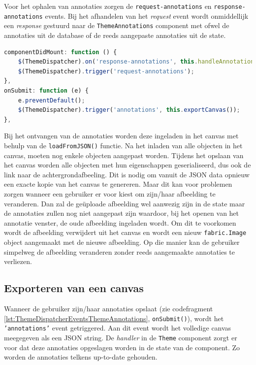 Voor het ophalen van annotaties zorgen de \texttt{request-annotations} en \texttt{response-annotations} events. Bij het afhandelen van het \textit{request} event wordt onmiddellijk een \textit{response} gestuurd naar de \texttt{ThemeAnnotations} component met ofwel de annotaties uit de database of de reeds aangepaste annotaties uit de state. 

\begin{lstlisting}[caption={ThemeAnnotations component - events},label=lst:ThemeDispatcherEventsThemeAnnotations,language=javascript]
componentDidMount: function () {
  	$(ThemeDispatcher).on('response-annotations', this.handleAnnotations);
	$(ThemeDispatcher).trigger('request-annotations');
},
onSubmit: function (e) {
	e.preventDefault();
	$(ThemeDispatcher).trigger('annotations', this.exportCanvas());
},
\end{lstlisting}

Bij het ontvangen van de annotaties worden deze ingeladen in het canvas met behulp van de \texttt{loadFromJSON()} functie. Na het inladen van alle objecten in het canvas, moeten nog enkele objecten aangepast worden. Tijdens het opslaan van het canvas worden alle objecten met hun eigenschappen geserialiseerd, dus ook de link naar de achtergrondafbeeling. Dit is nodig om vanuit de JSON data opnieuw een exacte kopie van het canvas te genereren. Maar dit kan voor problemen zorgen wanneer een gebruiker er voor kiest om zijn/haar afbeelding te veranderen. Dan zal de ge\"{u}ploade afbeelding wel aanwezig zijn in de state maar de annotaties zullen nog niet aangepast zijn waardoor, bij het openen van het annotatie venster, de oude afbeelding ingeladen wordt. Om dit te voorkomen wordt de afbeelding verwijdert uit het canvas en wordt een nieuw \texttt{fabric.Image} object aangemaakt met de nieuwe afbeelding. Op die manier kan de gebruiker simpelweg de afbeelding veranderen zonder reeds aangemaakte annotaties te verliezen. 

\subsection{Exporteren van een canvas}
Wanneer de gebruiker zijn/haar annotaties opslaat (zie codefragment \ref{lst:ThemeDispatcherEventsThemeAnnotations}, \texttt{onSubmit()}), wordt het \texttt{'annotations'} event getriggered. Aan dit event wordt het volledige canvas meegegeven als een JSON string. De \textit{handler} in de \texttt{Theme} component zorgt er voor dat deze annotaties opgeslagen worden in de state van de component. Zo worden de annotaties telkens up-to-date gehouden. 

